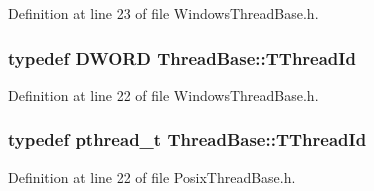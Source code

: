 Definition at line 23 of file Windows\-Thread\-Base.\-h.

\hypertarget{class_thread_base_a76da3758dcb9858188c493eb9b811f3d}{
\subsubsection[{T\-Thread\-Id}]{\setlength{\rightskip}{0pt plus 5cm}typedef D\-W\-O\-R\-D {\bf Thread\-Base\-::\-T\-Thread\-Id}\hspace{0.3cm}{\ttfamily [private]}}}\label{class_thread_base_a76da3758dcb9858188c493eb9b811f3d}


Definition at line 22 of file Windows\-Thread\-Base.\-h.

\hypertarget{class_thread_base_af8ec97aa7d89f9a4605a1c6c60777d5d}{
\subsubsection[{T\-Thread\-Id}]{\setlength{\rightskip}{0pt plus 5cm}typedef pthread\-\_\-t {\bf Thread\-Base\-::\-T\-Thread\-Id}\hspace{0.3cm}{\ttfamily [private]}}}\label{class_thread_base_af8ec97aa7d89f9a4605a1c6c60777d5d}


Definition at line 22 of file Posix\-Thread\-Base.\-h.



